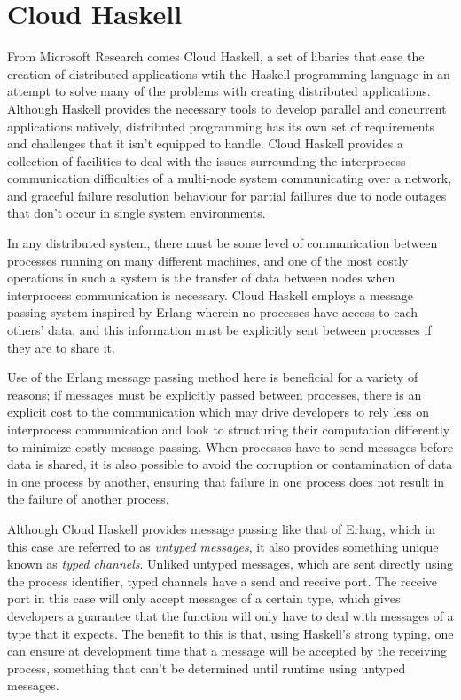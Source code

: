 \documentclass[10pt,a4paper,twocolumn]{article}
\begin{document}
\section{Cloud Haskell}

From Microsoft Research comes Cloud Haskell, a set of libaries that ease the
creation of distributed applications wtih the Haskell programming language in
an attempt to solve many of the problems with creating distributed applications.
Although Haskell provides the necessary tools to develop parallel and concurrent
applications natively, distributed programming has its own set of requirements
and challenges that it isn't equipped to handle. Cloud Haskell provides a
collection of facilities to deal with the issues surrounding the interprocess
communication difficulties of a multi-node system communicating over a
network, and graceful failure resolution behaviour for partial faillures due
to node outages that don't occur in single system environments.

In any distributed system, there must be some level of communication between
processes running on many different machines, and one of the most costly
operations in such a system is the transfer of data between nodes when
interprocess communication is necessary. Cloud Haskell employs a message passing
system inspired by Erlang wherein no processes have access to each others' data,
and this information must be explicitly sent between processes if they are to
share it.

Use of the Erlang message passing method here is beneficial for a variety of
reasons; if messages must be explicitly passed between processes, there is an
explicit cost to the communication which may drive developers to rely less on
interprocess communication and look to structuring their computation differently
to minimize costly message passing. When processes have to send messages before
data is shared, it is also possible to avoid the corruption or contamination of
data in one process by another, ensuring that failure in one process does not
result in the failure of another process.

Although Cloud Haskell provides message passing like that of Erlang, which in
this case are referred to as \emph{untyped messages}, it also provides something
unique known as \emph{typed channels}. Unliked untyped messages, which are sent
directly using the process identifier, typed channels have a send and receive
port. The receive port in this case will only accept messages of a certain type,
which gives developers a guarantee that the function will only have to deal with
messages of a type that it expects. The benefit to this is that, using Haskell's
strong typing, one can ensure at development time that a message will be
accepted by the receiving process, something that can't be determined until
runtime using untyped messages.
\end{document}
